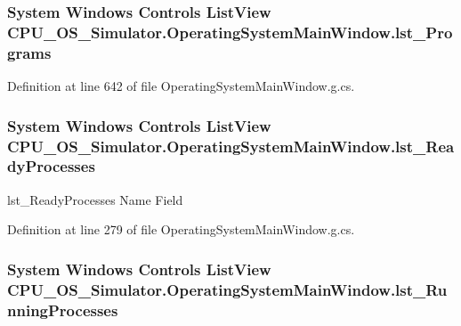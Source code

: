 \subsubsection[{lst\+\_\+\+Programs}]{\setlength{\rightskip}{0pt plus 5cm}System Windows Controls List\+View C\+P\+U\+\_\+\+O\+S\+\_\+\+Simulator.\+Operating\+System\+Main\+Window.\+lst\+\_\+\+Programs\hspace{0.3cm}{\ttfamily [package]}}\label{class_c_p_u___o_s___simulator_1_1_operating_system_main_window_a08c9b2131c204ca49f85c7dbc3c0bde2}


Definition at line 642 of file Operating\+System\+Main\+Window.\+g.\+cs.

\hypertarget{class_c_p_u___o_s___simulator_1_1_operating_system_main_window_a00397da2e841d089d65441f5d4f19915}{}
\subsubsection[{lst\+\_\+\+Ready\+Processes}]{\setlength{\rightskip}{0pt plus 5cm}System Windows Controls List\+View C\+P\+U\+\_\+\+O\+S\+\_\+\+Simulator.\+Operating\+System\+Main\+Window.\+lst\+\_\+\+Ready\+Processes}\label{class_c_p_u___o_s___simulator_1_1_operating_system_main_window_a00397da2e841d089d65441f5d4f19915}


lst\+\_\+\+Ready\+Processes Name Field 



Definition at line 279 of file Operating\+System\+Main\+Window.\+g.\+cs.

\hypertarget{class_c_p_u___o_s___simulator_1_1_operating_system_main_window_a8710fe75e8464b39764d29184c2510fd}{}
\subsubsection[{lst\+\_\+\+Running\+Processes}]{\setlength{\rightskip}{0pt plus 5cm}System Windows Controls List\+View C\+P\+U\+\_\+\+O\+S\+\_\+\+Simulator.\+Operating\+System\+Main\+Window.\+lst\+\_\+\+Running\+Processes}\label{class_c_p_u___o_s___simulator_1_1_operating_system_main_window_a8710fe75e8464b39764d29184c2510fd}


